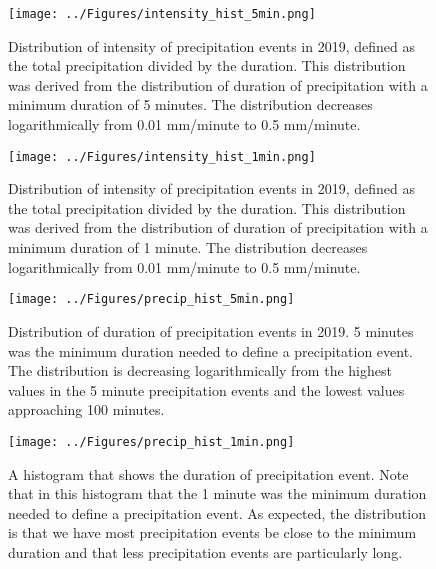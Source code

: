 %

\begin{figure}[h]
\centering
\texttt{[image: ../Figures/intensity\_hist\_5min.png]}
\caption{\label{abc}Distribution of intensity of precipitation events in 2019,
defined as the total precipitation divided by the duration. This
distribution was derived from the distribution of duration of
precipitation with a minimum duration of 5 minutes. The distribution
decreases logarithmically from 0.01 mm/minute to 0.5 mm/minute.} 
\end{figure}
\vfill
\begin{figure}[h]
\centering
\texttt{[image: ../Figures/intensity\_hist\_1min.png]}
\caption{\label{abcd}Distribution of intensity of precipitation events in 2019,
defined as the total precipitation divided by the duration. This
distribution was derived from the distribution of duration of
precipitation with a minimum duration of 1 minute. The distribution
decreases logarithmically from 0.01 mm/minute to 0.5 mm/minute.} 
\end{figure}
\vfill
\begin{figure}[h]
\centering\texttt{[image: ../Figures/precip\_hist\_5min.png]} 
\caption{\label{abce}Distribution
of duration of precipitation events in 2019. 5 minutes was the minimum
duration needed to define a precipitation event. The distribution is
decreasing logarithmically from the highest values in the 5 minute
precipitation events and the lowest values approaching 100 minutes.}
\end{figure}
\begin{figure}[h]
\centering
\texttt{[image: ../Figures/precip\_hist\_1min.png]}
\caption{\label{abcf}A histogram that shows the duration of precipitation
event. Note that in this histogram that the 1 minute was the minimum
duration needed to define a precipitation event. As expected, the
distribution is that we have most precipitation events be close to the
minimum duration and that less precipitation events are particularly
long. } 
\end{figure}
